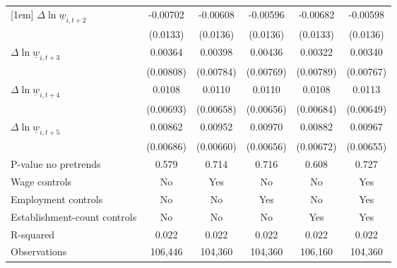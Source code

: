 {\begin{tabular}{l*{5}{c}}
[1em]
$\Delta \ln \underline{w}_{i,t+2}$& -0.00702         & -0.00608         & -0.00596         & -0.00682         & -0.00598         \\
          & (0.0133)         & (0.0136)         & (0.0136)         & (0.0133)         & (0.0136)         \\
[1em]
$\Delta \ln \underline{w}_{i,t+3}$&  0.00364         &  0.00398         &  0.00436         &  0.00322         &  0.00340         \\
          &(0.00808)         &(0.00784)         &(0.00769)         &(0.00789)         &(0.00767)         \\
[1em]
$\Delta \ln \underline{w}_{i,t+4}$&   0.0108         &   0.0110         &   0.0110\sym{*}  &   0.0108         &   0.0113\sym{*}  \\
          &(0.00693)         &(0.00658)         &(0.00656)         &(0.00684)         &(0.00649)         \\
[1em]
$\Delta \ln \underline{w}_{i,t+5}$&  0.00862         &  0.00952         &  0.00970         &  0.00882         &  0.00967         \\
          &(0.00686)         &(0.00660)         &(0.00656)         &(0.00672)         &(0.00655)         \\
\hline
P-value no pretrends&    0.579         &    0.714         &    0.716         &    0.608         &    0.727         \\
Wage controls&       No         &      Yes         &       No         &       No         &      Yes         \\
Employment controls&       No         &       No         &      Yes         &       No         &      Yes         \\
Establishment-count controls&       No         &       No         &       No         &      Yes         &      Yes         \\
R-squared &    0.022         &    0.022         &    0.022         &    0.022         &    0.022         \\
Observations&  106,446         &  104,360         &  104,360         &  106,160         &  104,360         \\
\hline\hline
\end{tabular}
}
